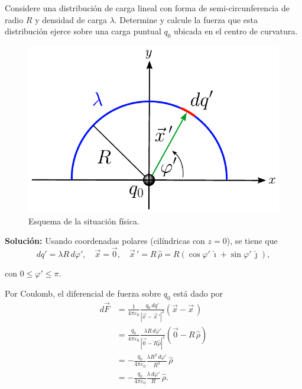 \begin{ejemplo}
    Considere una distribución de carga lineal con forma de semi-circunferencia de radio $R$ y densidad de carga $\lambda$. Determine y calcule la fuerza que esta distribución ejerce sobre una carga puntual $q_0$ ubicada en el centro de curvatura.

\begin{figure}[H]
    \centering
    \includegraphics[scale = 0.6]{Figuras/Ej-Distribucion-Carga-2.pdf}
    \caption{Esquema de la situación física.}
    \label{fig:Ej-Distri-Carga-2}
\end{figure}


\textbf{Solución:} Usando coordenadas polares (cilíndricas con $z = 0$), se tiene que
$$dq' = \lambda R \,d\varphi', \quad \Vec{x} = \Vec{0}, \quad \Vec{x}\,' = R \,\hat{\rho} = R (\cos \varphi ' \,\hat{\imath} + \sin \varphi ' \,\hat{\jmath}),$$

con $0 \leq \varphi ' \leq \pi$.

Por Coulomb, el diferencial de fuerza sobre $q_0$ está dado por
\begin{align*}
    d\Vec{F} &= \frac{1}{4\pi \varepsilon_0}  \frac{q_0 \,dq'}{|\Vec{x} - \Vec{x}\,'|^3}(\Vec{x} - \Vec{x}\,) \\
    &= \frac{q_0}{4\pi \varepsilon_0}  \frac{\lambda R \,d\varphi'}{|\Vec{0} - R \hat{\rho}|^3} (\Vec{0} - R \,\hat{\rho}) \\
    &=- \frac{q_0}{4\pi \varepsilon_0}  \frac{\lambda R^2 \,d \varphi'}{R^3} \,\hat{\rho} \\
    &= - \frac{q_0}{4\pi \varepsilon_0}  \frac{\lambda \,d \varphi'}{R} \,\hat{\rho}.
\end{align*}


\end{ejemplo}
